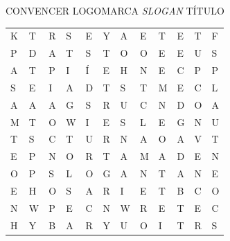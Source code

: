 \begin{myquote}
CONVENCER \hfill LOGOMARCA \hfill \textit{SLOGAN} \hfill TÍTULO \hfill
\end{myquote}

\begin{center}
\begin{tabular}{llllllllllll}
K & T & R & S & E & Y & A & E & T & E & T & F\\
P & D & A & T & S & T & O & O & E & E & U & S\\
A & T & P & I & Í & E & H & N & E & C & P & P\\
S & E & I & A & D & T & S & T & M & E & C & L\\
A & A & A & G & S & R & U & C & N & D & O & A\\
M & T & O & W & I & E & S & L & E & G & N & U\\
T & S & C & T & U & R & N & A & O & A & V & T\\
E & P & N & O & R & T & A & M & A & D & E & N\\
O & P & S & L & O & G & A & N & T & A & N & E\\
E & H & O & S & A & R & I & E & T & B & C & O\\
N & W & P & E & C & N & W & R & E & T & E & C\\
H & Y & B & A & R & Y & U & O & I & T & R & S
\end{tabular}
\end{center}
\pagebreak

